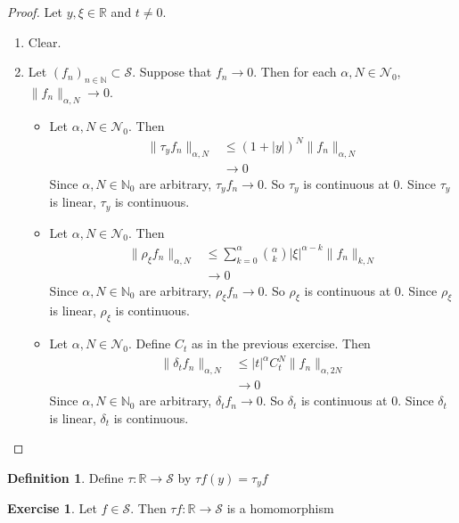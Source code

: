 \documentclass[12pt]{amsart}
\theoremstyle{definition}
\newtheorem{defn}[definition]{Definition}
\newtheorem{ex}[definition]{Exercise}
\newcommand{\al}{\alpha}
\newcommand{\del}{\delta}
\newcommand{\N}{\mathbb{N}}
\newcommand{\R}{\mathbb{R}}
\newcommand{\MN}{\mathcal{N}}
\newcommand{\MS}{\mathcal{S}}
\begin{document}
	\begin{proof} Let $y, \xi \in \R$ and $t \neq 0$.
		\begin{enumerate}
			\item Clear.
			\item Let $(f_n)_{n \in \N} \subset \MS$. Suppose that $f_n \rightarrow 0$. Then for each $\al,N \in \MN_0$, $\|f_n\|_{\al, N} \rightarrow 0$. 
			\begin{itemize}
				\item Let $\al,N \in \MN_0$. Then 
				\begin{align*}
					\|\tau_yf_n\|_{\al, N} 
					& \leq (1 + |y|)^N\|f_n\|_{\al, N} \\
					& \rightarrow 0
				\end{align*}
				Since $\al, N \in \N_0$ are arbitrary, $\tau_yf_n \rightarrow 0$. So $\tau_y$  is continuous at $0$. Since $\tau_y$ is linear, $\tau_y$ is continuous.
				\item Let $\al,N \in \MN_0$. Then 
				\begin{align*}
					\|\rho_{\xi}f_n\|_{\al, N} 
					& \leq \sum\limits_{k=0}^{\al} {\al \choose k} |\xi|^{\al-k} \|f_n\|_{k, N} \\
					& \rightarrow 0
				\end{align*}
				Since $\al, N \in \N_0$ are arbitrary, $\rho_{\xi}f_n \rightarrow 0$. So $\rho_{\xi}$  is continuous at $0$. Since $\rho_{\xi}$ is linear, $\rho_{\xi}$ is continuous.
				\item Let $\al,N \in \MN_0$. Define $C_t$ as in the previous exercise. Then 
				\begin{align*}
					\|\del_t f_n\|_{\al, N} 
					& \leq |t|^{\al} C_t^N \|f_n\|_{\al, 2N} \\
					& \rightarrow 0
				\end{align*}
				Since $\al, N \in \N_0$ are arbitrary, $\del_t f_n \rightarrow 0$. So $\del_t$  is continuous at $0$. Since $\del_t$ is linear, $\del_t$ is continuous.
			\end{itemize} 
		\end{enumerate}
	\end{proof}

	\begin{defn}
		Define  $\tau: \R \rightarrow \MS$ by $\tau f(y) = \tau_y f$
	\end{defn}

	\begin{ex}
		Let $f \in \MS$. Then $\tau f: \R \rightarrow \MS$ is a homomorphism
	\end{ex}
\end{document}
